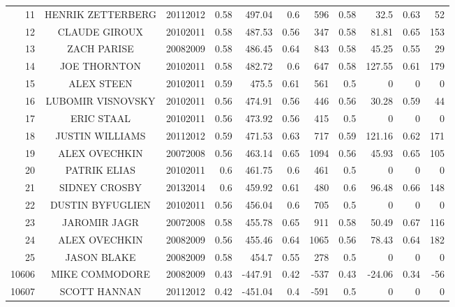 \begin{table}[p]
\begin{tabular}{r c c r r r r r r r r }
            		11    & HENRIK ZETTERBERG & 20112012 & 0.58  & 497.04 & 0.6   & 596   & 0.58  & 32.5  & 0.63  & 52 \\
            		12    & CLAUDE GIROUX & 20102011 & 0.58  & 487.53 & 0.56  & 347   & 0.58  & 81.81 & 0.65  & 153 \\
            		13    & ZACH PARISE & 20082009 & 0.58  & 486.45 & 0.64  & 843   & 0.58  & 45.25 & 0.55  & 29 \\
            		14    & JOE THORNTON & 20102011 & 0.58  & 482.72 & 0.6   & 647   & 0.58  & 127.55 & 0.61  & 179 \\
            		15    & ALEX STEEN & 20102011 & 0.59  & 475.5 & 0.61  & 561   & 0.5   & 0     & 0     & 0 \\
            		16    & LUBOMIR VISNOVSKY & 20102011 & 0.56  & 474.91 & 0.56  & 446   & 0.56  & 30.28 & 0.59  & 44 \\
            		17    & ERIC STAAL & 20102011 & 0.56  & 473.92 & 0.56  & 415   & 0.5   & 0     & 0     & 0 \\
            		18    & JUSTIN WILLIAMS & 20112012 & 0.59  & 471.53 & 0.63  & 717   & 0.59  & 121.16 & 0.62  & 171 \\
            		19    & ALEX OVECHKIN & 20072008 & 0.56  & 463.14 & 0.65  & 1094  & 0.56  & 45.93 & 0.65  & 105 \\
            		20    & PATRIK ELIAS & 20102011 & 0.6   & 461.75 & 0.6   & 461   & 0.5   & 0     & 0     & 0 \\
            		21    & SIDNEY CROSBY & 20132014 & 0.6   & 459.92 & 0.61  & 480   & 0.6   & 96.48 & 0.66  & 148 \\
            		22    & DUSTIN BYFUGLIEN & 20102011 & 0.56  & 456.04 & 0.6   & 705   & 0.5   & 0     & 0     & 0 \\
            		23    & JAROMIR JAGR & 20072008 & 0.58  & 455.78 & 0.65  & 911   & 0.58  & 50.49 & 0.67  & 116 \\
            		24    & ALEX OVECHKIN & 20082009 & 0.56  & 455.46 & 0.64  & 1065  & 0.56  & 78.43 & 0.64  & 182 \\
            		25    & JASON BLAKE & 20082009 & 0.58  & 454.7 & 0.55  & 278   & 0.5   & 0     & 0     & 0 \\ 
            		\hline\rule{0pt}{4ex} 
            		10606 & MIKE COMMODORE & 20082009 & 0.43  & -447.91 & 0.42  & -537  & 0.43  & -24.06 & 0.34  & -56 \\ 
            		10607 & SCOTT HANNAN & 20112012 & 0.42  & -451.04 & 0.4   & -591  & 0.5   & 0     & 0     & 0 \\

\end{tabular}
\end{table}
